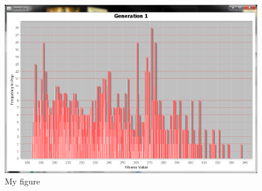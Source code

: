 \documentclass[10pt,twocolumn]{article}
\begin{document}
\begin{figure} [ht]
\centering
\includegraphics[scale = 0.25]{gen1-2500.png}
\caption{My figure}
\label{the-label-for-cross-referencing}
\end{figure}




\end{document}
